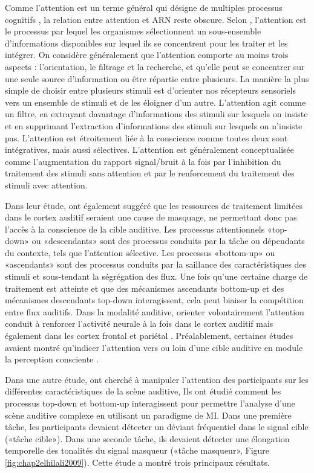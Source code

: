 Comme l'attention est un terme général qui désigne de multiples processus cognitifs \citep{petersen2012attention}, la relation entre attention et ARN reste obscure. 
Selon \cite{ward2004attention}, l'attention est le processus par lequel les organismes sélectionnent un sous-ensemble d'informations disponibles sur lequel ils se concentrent pour les traiter et les intégrer. 
On considère généralement que l'attention comporte au moins trois aspects : l'orientation, le filtrage et la recherche, et qu'elle peut se concentrer sur une seule source d'information ou être répartie entre plusieurs. 
La manière la plus simple de choisir entre plusieurs stimuli est d'orienter nos récepteurs sensoriels vers un ensemble de stimuli et de les éloigner d'un autre. 
L'attention agit comme un filtre, en extrayant davantage d'informations des stimuli sur lesquels on insiste et en supprimant l'extraction d'informations des stimuli sur lesquels on n'insiste pas. 
L'attention est étroitement liée à la conscience comme toutes deux sont intégratives, mais aussi sélectives. 
L'attention est généralement conceptualisée comme l'augmentation du rapport signal/bruit à la fois par l'inhibition du traitement des stimuli sans attention et par le renforcement du traitement des stimuli avec attention. 

Dans leur étude, \cite{gutschalk2008neural} ont également suggéré que les ressources de traitement limitées dans le cortex auditif seraient une cause de masquage, ne permettant donc pas l'accès à la conscience de la cible auditive. 
Les processus attentionnels «top-down» ou «descendants» sont des processus conduits par la tâche ou dépendants du contexte, tels que l'attention sélective.
Les processus «bottom-up» ou «ascendants» sont des processus conduits par la saillance des caractéristiques des stimuli et sous-tendant la ségrégation des flux. 
Une fois qu'une certaine charge de traitement est atteinte et que des mécanismes ascendants bottom-up et des mécanismes descendants top-down interagissent, cela peut biaiser la compétition entre flux auditifs. 
Dans la modalité auditive, orienter volontairement l'attention conduit à renforcer l'activité neurale à la fois dans le cortex auditif mais également dans les cortex frontal et pariétal \citep{eklund2019electrophysiological}. 
Préalablement, certaines études avaient montré qu'indicer l'attention vers ou loin d'une cible auditive en module la perception consciente \citep{leek1991informational, richards2004cuing}. 

Dans une autre étude, \cite{elhilali2009interaction} ont cherché à manipuler l'attention des participants sur les différentes caractéristiques de la scène auditive, 
Ils ont étudié comment les processus top-down et bottom-up interagissent pour permettre l'analyse d'une scène auditive complexe en utilisant un paradigme de MI. 
Dans une première tâche, les participants devaient détecter un déviant fréquentiel dans le signal cible («tâche cible»). 
Dans une seconde tâche, ils devaient détecter une élongation temporelle des tonalités du signal masqueur («tâche masqueur», Figure \ref{fig:chap2elhilali2009}). 
Cette étude a montré trois principaux résultats. 

